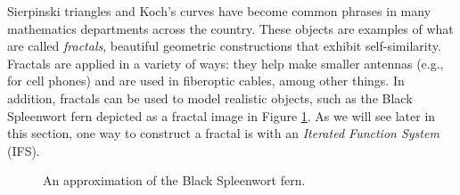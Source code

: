  \label{chap:linear_transformation}

\vspace*{-17 pt}

\vspace*{13 pt}

\label{sec:appl_fractals}   

Sierpinski triangles and Koch's curves have become common phrases in many mathematics departments across the country. These objects are examples of what are called \emph{fractals}, beautiful geometric constructions that exhibit self-similarity.  Fractals are applied in a variety of ways: they help make smaller antennas (e.g., for cell phones) and are used in fiberoptic cables, among other things. In addition, fractals can be used to model realistic objects, such as the Black Spleenwort fern depicted as a fractal image in Figure \ref{F:Fern}. As we will see later in this section, one way to construct a fractal is with an \emph{Iterated Function System} (IFS). 
\begin{figure}[h]
\begin{center}
\caption{An approximation of the Black Spleenwort fern.}
\label{F:Fern}
\end{center}
\end{figure}

\label{sec:lin_trans_intro}

